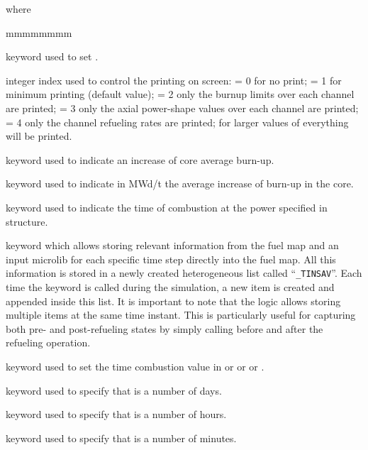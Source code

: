 \noindent where
\begin{ListeDeDescription}{mmmmmmmm}

\item[\moc{EDIT}] keyword used to set .

\item[\dusa{iprint}] integer index used to control the printing on screen:
 = 0 for no print; = 1 for minimum printing (default value); = 2 only the burnup limits
over each channel are printed; = 3 only the axial power-shape values over each channel
are printed; = 4 only the channel refueling rates are printed; for larger values of
 everything will be printed.

\item[\moc{BURN-STEP}] keyword used to indicate an increase of core average burn-up.

\item[\dusa{rburn}] keyword used to indicate in MWd/t the average increase
of burn-up in the core.

\item[\moc{TIME}] keyword used to indicate the time of combustion at the power specified
in  structure.

\item[\moc{SAVE}] keyword which allows storing relevant information from the fuel map and an
input microlib for each specific time step directly into the fuel map. All this information is
stored in a newly created heterogeneous list called “{\tt \_TINSAV}”. Each time the  keyword is
called during the simulation, a new item is created and appended inside this list. It is important
to note that the logic allows storing multiple items at the same time instant. This is particularly
useful for capturing both pre- and post-refueling states by simply calling  before and after
the refueling operation.

\item[\dusa{rtime}] keyword used to set the time combustion value in  or 
or  or .

\item[\moc{DAY}] keyword used to specify that  is a number of days.

\item[\moc{HOUR}] keyword used to specify that  is a number of hours.

\item[\moc{MINUTE}] keyword used to specify that  is a number of minutes.


\end{ListeDeDescription}
